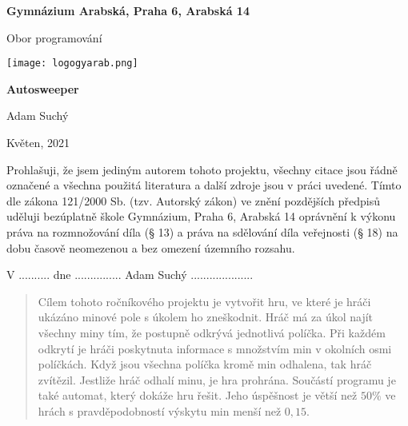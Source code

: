 
\begin{titlepage}
\begin{center}
\large \vspace*{\fill}
\thispagestyle{empty}

\LARGE

{ \huge \textbf{Gymnázium Arabská, Praha 6, Arabská 14}}

{\LARGE Obor programování }

\vfill
\texttt{[image: logogyarab.png]}
\vspace{15pt}

\vfill

{\huge \textbf{Autosweeper}}

\vfill

Adam Suchý

\vfill

{\large Květen, 2021}

\vspace*{\fill}
\end{center}
\end{titlepage}

\thispagestyle{empty}
\addtocounter{page}{-1}
\vspace*{\fill}
Prohlašuji, že jsem jediným autorem tohoto projektu, všechny citace jsou řádně označené a všechna
použitá literatura a další zdroje jsou v práci uvedené. Tímto dle zákona 121/2000 Sb. (tzv. Autorský zákon) 
ve znění pozdějších předpisů uděluji bezúplatně škole Gymnázium, Praha 6, Arabská 14 oprávnění k výkonu 
práva na rozmnožování díla (§ 13) a práva na sdělování díla veřejnosti (§ 18) na dobu časově neomezenou a 
bez omezení územního rozsahu.
\bigskip

V .......... dne ............... \hspace{4cm} Adam Suchý ....................
\vspace{2cm}

\newpage
\begin{abstract}
    Cílem tohoto ročníkového projektu je vytvořit hru, ve které je hráči ukázáno minové pole s úkolem ho
    zneškodnit. Hráč má za úkol najít všechny miny tím, že postupně odkrývá jednotlivá políčka. Při 
    každém odkrytí je hráči poskytnuta informace s množstvím min v okolních osmi políčkách. Když jsou 
    všechna políčka kromě min odhalena, tak hráč zvítězil. Jestliže hráč odhalí minu, je hra prohrána.
    Součástí programu je také automat, který dokáže hru řešit. Jeho úspěšnost je větší než $50\%$ ve 
    hrách s pravděpodobností výskytu min menší než $0,15$.
\end{abstract}

\tableofcontents